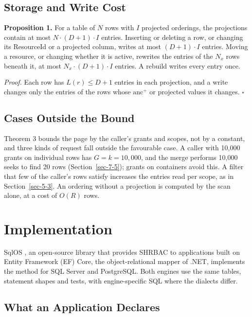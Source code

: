 \documentclass[conference]{IEEEtran}
\begin{document}
\subsection{Storage and Write Cost}\label{sec-5-4}

\textbf{Proposition 1.} For a table of \(N\) rows with \(I\) projected orderings, the projections contain at most \(N \cdot (D+1) \cdot I\) entries. Inserting or deleting a row, or changing its ResourceId or a projected column, writes at most \((D+1) \cdot I\) entries. Moving a resource, or changing whether it is active, rewrites the entries of the \(N_x\) rows beneath it, at most \(N_x \cdot (D+1) \cdot I\) entries. A rebuild writes every entry once.

\emph{Proof.} Each row has \(L(r) \le D + 1\) entries in each projection, and a write changes only the entries of the rows whose \(\mathrm{anc}^{+}\) or projected values it changes. \(\square\)

\subsection{Cases Outside the Bound}\label{sec-5-5}

Theorem 3 bounds the page by the caller's grants and scopes, not by a constant, and three kinds of request fall outside the favourable case. A caller with 10,000 grants on individual rows has \(G = k = 10{,}000\), and the merge performs 10,000 seeks to find 20 rows (Section~\ref{sec-7-5}); grants on containers avoid this. A filter that few of the caller's rows satisfy increases the entries read per scope, as in Section~\ref{sec-5-3}. An ordering without a projection is computed by the scan alone, at a cost of \(O(R)\) rows.

\section{Implementation}\label{sec-6}

SqlOS \cite{ref18}, an open-source library that provides SHRBAC to applications built on Entity Framework (EF) Core, the object-relational mapper of .NET, implements the method for SQL Server and PostgreSQL. Both engines use the same tables, statement shapes and tests, with engine-specific SQL where the dialects differ.

\subsection{What an Application Declares}\label{sec-6-1}
\end{document}
